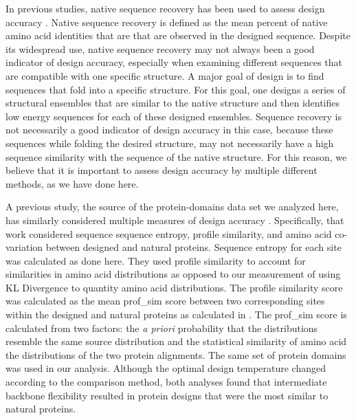\documentclass[12pt]{article}
\begin{document}
In previous studies, native sequence recovery has been used to assess design accuracy \citep{Ganinza2012, Barth2007}. Native sequence recovery is defined as the mean percent of native amino acid identities that are that are observed in the designed sequence. Despite its widespread use, native sequence recovery may not always been a good indicator of design accuracy, especially when examining different sequences that are compatible with one specific structure. A major goal of design is to find sequences that fold into a specific structure. For this goal, one designs a series of structural ensembles that are similar to the native structure and then identifies low energy sequences for each of these designed ensembles. Sequence recovery is not necessarily a good indicator of design accuracy in this case, because these sequences while folding the desired structure, may not necessarily have a high sequence similarity with the sequence of the native structure.  For this reason, we believe that it is important to assess design accuracy by multiple different methods, as we have done here.

A previous study, the source of the protein-domains data set we analyzed here, has similarly considered multiple measures of design accuracy \citep{OllikainenKortemme}. Specifically, that work considered sequence sequence entropy, profile similarity, and amino acid co-variation between designed and natural proteins. Sequence entropy for each site was calculated as done here. They used profile similarity to account for similarities in amino acid distributions as opposed to our measurement of using KL Divergence to quantity amino acid distributions. The profile similarity score was calculated as the mean prof\_sim score between two corresponding sites within the designed and natural proteins as calculated in \citet{Yona2002}. The prof\_sim score is calculated from two factors: the \textit{a priori} probability that the distributions resemble the same source distribution and the statistical similarity of amino acid the distributions of the two protein alignments. The same set of protein domains was used in our analysis. Although the optimal design temperature changed according to the comparison method, both analyses found that intermediate backbone flexibility resulted in protein designs that were the most similar to natural proteins.
\end{document}
